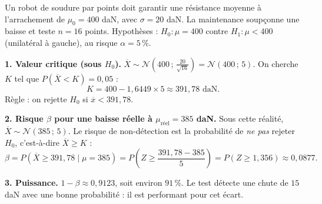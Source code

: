 \documentclass[a4paper,11pt]{article}
\begin{document}
\begin{exemple}
Un robot de soudure par points doit garantir une résistance moyenne à l'arrachement de $\mu_0 = 400$ daN, avec $\sigma = 20$ daN. La maintenance soupçonne une baisse et teste $n = 16$ points. Hypothèses : $H_0 : \mu = 400$ contre $H_1 : \mu < 400$ (unilatéral à gauche), au risque $\alpha = 5\,\%$.

\vspace{4pt}
\textbf{1. Valeur critique (sous $H_0$).} $\overline{X} \sim \mathcal{N}\!\left(400\,;\,\frac{20}{\sqrt{16}}\right) = \mathcal{N}(400\,;\,5)$. On cherche $K$ tel que $P(\overline{X} < K) = 0{,}05$ :
\[
K = 400 - 1{,}6449 \times 5 \approx 391{,}78 \text{ daN.}
\]
Règle : on rejette $H_0$ si $\overline{x} < 391{,}78$.

\vspace{4pt}
\textbf{2. Risque $\beta$ pour une baisse réelle à $\mu_{\text{réel}} = 385$ daN.} Sous cette réalité, $\overline{X} \sim \mathcal{N}(385\,;\,5)$. Le risque de non-détection est la probabilité de \emph{ne pas} rejeter $H_0$, c'est-à-dire $\overline{X} \geq K$ :
\[
\beta = P(\overline{X} \geq 391{,}78 \mid \mu = 385) = P\!\left(Z \geq \frac{391{,}78 - 385}{5}\right) = P(Z \geq 1{,}356) \approx 0{,}0877.
\]

\vspace{4pt}
\textbf{3. Puissance.} $1 - \beta \approx 0{,}9123$, soit environ $91\,\%$. Le test détecte une chute de $15$ daN avec une bonne probabilité : il est performant pour cet écart.
\end{exemple}
\end{document}
